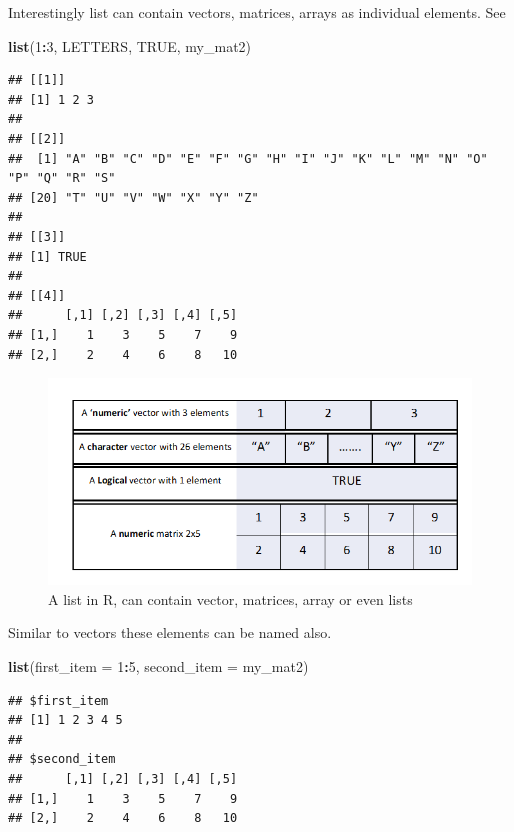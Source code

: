 \documentclass[
]{book}
\newenvironment{Shaded}{\begin{snugshade}}{\end{snugshade}}
\newcommand{\AttributeTok}[1]{\textcolor[rgb]{0.13,0.29,0.53}{#1}}
\newcommand{\ConstantTok}[1]{\textcolor[rgb]{0.56,0.35,0.01}{#1}}
\newcommand{\DecValTok}[1]{\textcolor[rgb]{0.00,0.00,0.81}{#1}}
\newcommand{\FunctionTok}[1]{\textcolor[rgb]{0.13,0.29,0.53}{\textbf{#1}}}
\newcommand{\NormalTok}[1]{#1}
\newcommand{\SpecialCharTok}[1]{\textcolor[rgb]{0.81,0.36,0.00}{\textbf{#1}}}
\begin{document}
Interestingly list can contain vectors, matrices, arrays as individual elements. See

\begin{Shaded}
\begin{Highlighting}[]
\FunctionTok{list}\NormalTok{(}\DecValTok{1}\SpecialCharTok{:}\DecValTok{3}\NormalTok{, LETTERS, }\ConstantTok{TRUE}\NormalTok{, my\_mat2)}
\end{Highlighting}
\end{Shaded}

\begin{verbatim}
## [[1]]
## [1] 1 2 3
## 
## [[2]]
##  [1] "A" "B" "C" "D" "E" "F" "G" "H" "I" "J" "K" "L" "M" "N" "O" "P" "Q" "R" "S"
## [20] "T" "U" "V" "W" "X" "Y" "Z"
## 
## [[3]]
## [1] TRUE
## 
## [[4]]
##      [,1] [,2] [,3] [,4] [,5]
## [1,]    1    3    5    7    9
## [2,]    2    4    6    8   10
\end{verbatim}

\begin{figure}

{\centering \includegraphics[width=0.99\linewidth]{images/list_ex2} 

}

\caption{A list in R, can contain vector, matrices, array or even lists}\label{fig:exlist2}
\end{figure}

Similar to vectors these elements can be named also.

\begin{Shaded}
\begin{Highlighting}[]
\FunctionTok{list}\NormalTok{(}\AttributeTok{first\_item =} \DecValTok{1}\SpecialCharTok{:}\DecValTok{5}\NormalTok{, }\AttributeTok{second\_item =}\NormalTok{ my\_mat2)}
\end{Highlighting}
\end{Shaded}

\begin{verbatim}
## $first_item
## [1] 1 2 3 4 5
## 
## $second_item
##      [,1] [,2] [,3] [,4] [,5]
## [1,]    1    3    5    7    9
## [2,]    2    4    6    8   10
\end{verbatim}
\end{document}
